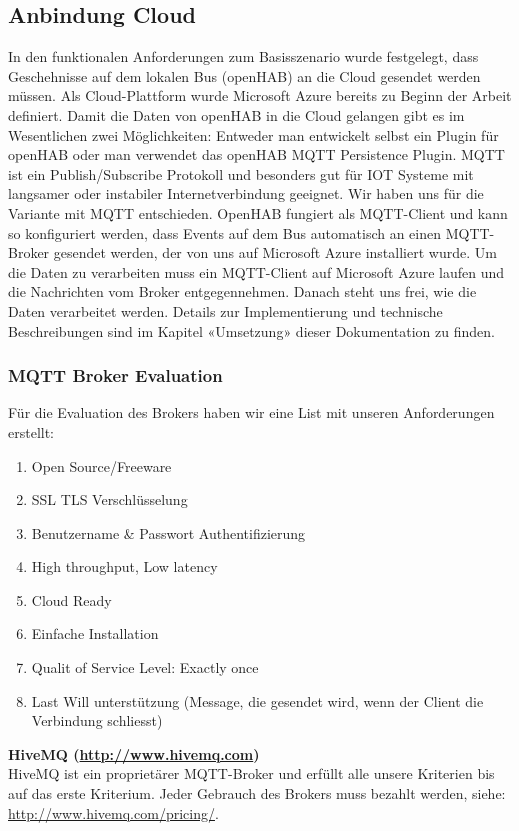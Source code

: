 \subsection{Anbindung Cloud}

In den funktionalen Anforderungen zum Basisszenario wurde festgelegt, dass Geschehnisse auf dem lokalen Bus (openHAB) an die Cloud gesendet werden müssen. Als Cloud-Plattform wurde Microsoft Azure bereits zu Beginn der Arbeit definiert. Damit die Daten von openHAB in die Cloud gelangen gibt es im Wesentlichen zwei Möglichkeiten: Entweder man entwickelt selbst ein Plugin für openHAB oder man verwendet das openHAB MQTT Persistence Plugin. MQTT ist ein Publish/Subscribe Protokoll und besonders gut für IOT Systeme mit langsamer oder instabiler Internetverbindung geeignet. Wir haben uns für die Variante mit MQTT entschieden. OpenHAB fungiert als MQTT-Client und kann so konfiguriert werden, dass Events auf dem Bus automatisch an einen MQTT-Broker gesendet werden, der von uns auf Microsoft Azure installiert wurde. Um die Daten zu verarbeiten muss ein MQTT-Client auf Microsoft Azure laufen und die Nachrichten vom Broker entgegennehmen. Danach steht uns frei, wie die Daten verarbeitet werden. Details zur Implementierung und technische Beschreibungen sind im Kapitel «Umsetzung» dieser Dokumentation zu finden. 

\subsubsection{MQTT Broker Evaluation}
Für die Evaluation des Brokers haben wir eine List mit unseren Anforderungen erstellt: 

\begin{enumerate}
	\item Open Source/Freeware
	\item SSL TLS Verschlüsselung
	\item Benutzername \& Passwort Authentifizierung
	\item High throughput, Low latency
	\item Cloud Ready
	\item Einfache Installation
	\item Qualit of Service Level: Exactly once
	\item Last Will unterstützung (Message, die gesendet wird, wenn der Client die Verbindung schliesst)
\end{enumerate}

\textbf{HiveMQ (\url{http://www.hivemq.com})} \\
HiveMQ ist ein proprietärer MQTT-Broker und erfüllt alle unsere Kriterien bis auf das erste Kriterium. Jeder Gebrauch des Brokers muss bezahlt werden, siehe: \url{http://www.hivemq.com/pricing/}.

